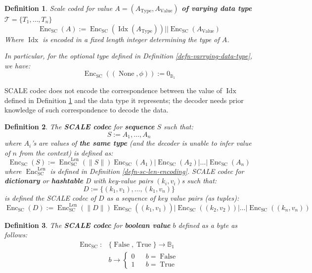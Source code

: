 \documentclass{book}
\newcommand{\assign}{:=}
\newcommand{\tmop}[1]{\ensuremath{\operatorname{#1}}}
\newcommand{\tmstrong}[1]{\textbf{#1}}
\newtheorem{definition}{Definition}
\newtheorem{definition}{Definition}
\begin{document}
\begin{definition}
  \label{defn-scale-variable-type}Scale coded for value {\tmstrong{$A =
  (A_{\tmop{Type}}, A_{\tmop{Value}})$ of varying data type}} $\mathcal{T}= \{
  T_1, \ldots, T_n \}$
  \[ \tmop{Enc}_{\tmop{SC}} (A) \assign \tmop{Enc}_{\tmop{SC}} (\tmop{Idx}
     (A_{\tmop{Type}})) | | \tmop{Enc}_{\tmop{SC}} (A_{\tmop{Value}}) \]
  Where $\tmop{Idx}$ is encoded in a fixed length integer determining the type
  of $A$.
  
  In particular, for the optional type defined in Definition
  \ref{defn-varrying-data-type}, we have:
  \[ \tmop{Enc}_{\tmop{SC}} ((\tmop{None}, \phi)) \assign 0_{\mathbb{B}_1} \]
\end{definition}

SCALE codec does not encode the correspondence between the value of
$\tmop{Idx}$ defined in Definition \ref{defn-scale-variable-type} and the data
type it represents; the decoder needs prior knowledge of such correspondence
to decode the data.

\begin{definition}
  \label{defn-scale-list}The {\tmstrong{SCALE codec}} for
  {\tmstrong{sequence}} $S$ such that:
  \[ S \assign A_1, \ldots, A_n \]
  where $A_i$'s are values of {\tmstrong{the same type}} (and the decoder is
  unable to infer value of $n$ from the context) is defined as:
  \[ \tmop{Enc}_{\tmop{SC}} (S) \assign \tmop{Enc}^{\tmop{Len}}_{\tmop{SC}}
     (\| S \|) \tmop{Enc}_{\tmop{SC}} (A_1) | \tmop{Enc}_{\tmop{SC}} (A_2) |
     \ldots | \tmop{Enc}_{\tmop{SC}} (A_n) \]
  where $\tmop{Enc}_{\tmop{SC}}^{\tmop{Len}}$ is defined in Definition
  \ref{defn-sc-len-encoding}. SCALE codec for {\tmstrong{dictionary}} or
  {\tmstrong{hashtable}} D with key-value pairs $(k_i, v_i)$s such that:
  \[ D \assign \{ (k_1, v_1), \ldots, (k_1, v_n) \} \]
  is defined the SCALE codec of $D$ as a sequence of key value pairs (as
  tuples):
  \[ \tmop{Enc}_{\tmop{SC}} (D) \assign \tmop{Enc}^{\tmop{Len}}_{\tmop{SC}}
     (\| D \|) \tmop{Enc}_{\tmop{SC}} ((k_1, v_1)_{}) | \tmop{Enc}_{\tmop{SC}}
     ((k_2, v_2)) | \ldots | \tmop{Enc}_{\tmop{SC}} ((k_n, v_n)) \]
  \[ \  \]
\end{definition}

\begin{definition}
  The {\tmstrong{SCALE codec}} for {\tmstrong{boolean value}} $b$ defined as a
  byte as follows:
  \[ \begin{array}{ll}
       \tmop{Enc}_{\tmop{SC}} : & \{ \tmop{False}, \tmop{True} \} \rightarrow
       \mathbb{B}_1\\
       & b \rightarrow \left\{ \begin{array}{lcl}
         0 &  & b = \tmop{False}\\
         1 &  & b = \tmop{True}
       \end{array} \right.
     \end{array} \]
\end{definition}
\end{document}
